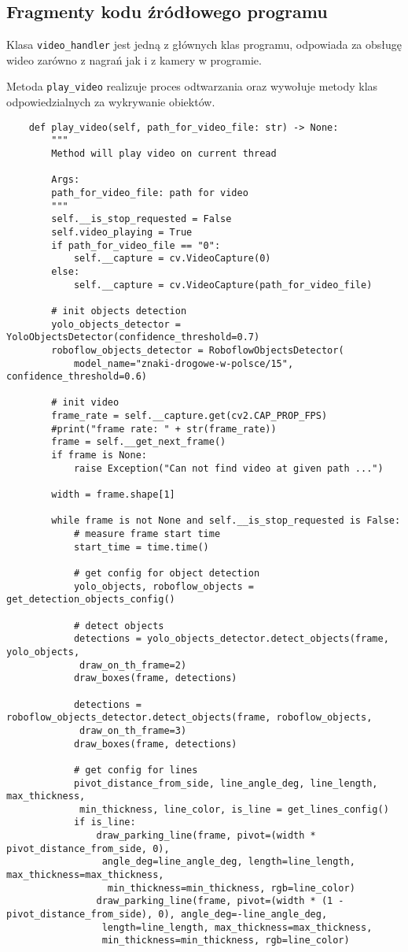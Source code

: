 \subsection{Fragmenty kodu źródłowego programu}

Klasa \verb|video_handler| jest jedną z głównych klas programu, odpowiada za obsługę wideo zarówno z nagrań jak i z kamery w programie.

Metoda \verb|play_video| realizuje proces odtwarzania oraz wywołuje metody klas odpowiedzialnych za wykrywanie obiektów.

\begin{verbatim}
	def play_video(self, path_for_video_file: str) -> None:
		"""
		Method will play video on current thread
		
		Args:
		path_for_video_file: path for video
		"""
		self.__is_stop_requested = False
		self.video_playing = True
		if path_for_video_file == "0":
			self.__capture = cv.VideoCapture(0)
		else:
			self.__capture = cv.VideoCapture(path_for_video_file)
		
		# init objects detection
		yolo_objects_detector = YoloObjectsDetector(confidence_threshold=0.7)
		roboflow_objects_detector = RoboflowObjectsDetector(
			model_name="znaki-drogowe-w-polsce/15", confidence_threshold=0.6)
		
		# init video
		frame_rate = self.__capture.get(cv2.CAP_PROP_FPS)
		#print("frame rate: " + str(frame_rate))
		frame = self.__get_next_frame()
		if frame is None:
			raise Exception("Can not find video at given path ...")
		
		width = frame.shape[1]
		
		while frame is not None and self.__is_stop_requested is False:
			# measure frame start time
			start_time = time.time()
			
			# get config for object detection
			yolo_objects, roboflow_objects = get_detection_objects_config()
			
			# detect objects
			detections = yolo_objects_detector.detect_objects(frame, yolo_objects,
			 draw_on_th_frame=2)
			draw_boxes(frame, detections)
			
			detections = roboflow_objects_detector.detect_objects(frame, roboflow_objects,
			 draw_on_th_frame=3)
			draw_boxes(frame, detections)
			
			# get config for lines
			pivot_distance_from_side, line_angle_deg, line_length, max_thickness,
			 min_thickness, line_color, is_line = get_lines_config()
			if is_line:
				draw_parking_line(frame, pivot=(width * pivot_distance_from_side, 0),
				 angle_deg=line_angle_deg, length=line_length, max_thickness=max_thickness,
				  min_thickness=min_thickness, rgb=line_color)
				draw_parking_line(frame, pivot=(width * (1 - pivot_distance_from_side), 0), angle_deg=-line_angle_deg,
				 length=line_length, max_thickness=max_thickness, 
			     min_thickness=min_thickness, rgb=line_color)
			

\end{verbatim}

